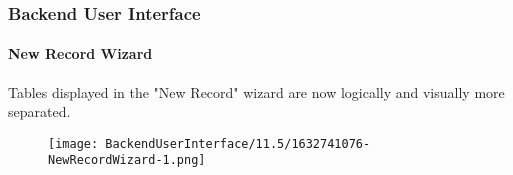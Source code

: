 %

\begin{frame}[fragile]
	\frametitle{Backend User Interface}
	\framesubtitle{New Record Wizard}

	Tables displayed in the "New Record" wizard are now logically and visually
	more separated.

	\begin{figure}
		\texttt{[image: BackendUserInterface/11.5/1632741076-NewRecordWizard-1.png]}
	\end{figure}

\end{frame}

